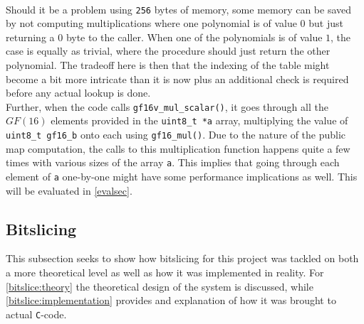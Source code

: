 \medskip\\
Should it be a problem using \texttt{256} bytes of memory, some memory can be saved by not computing multiplications where one polynomial is of value $0$ but just returning a $0$ byte to the caller. When one of the polynomials is of value $1$, the case is equally as trivial, where the procedure should just return the other polynomial. The tradeoff here is then that the indexing of the table might become a bit more intricate than it is now plus an additional check is required before any actual lookup is done.
\medskip\\
Further, when the code calls \texttt{gf16v\_mul\_scalar()}, it goes through all the $GF(16)$ elements provided in the \texttt{uint8\_t *a} array, multiplying the value of \texttt{uint8\_t gf16\_b} onto each using \texttt{gf16\_mul()}. Due to the nature of the public map computation, the calls to this multiplication function happens quite a few times with various sizes of the array \texttt{a}. This implies that going through each element of \texttt{a} one-by-one might have some performance implications as well. This will be evaluated in \cref{evalsec}.
\subsection{Bitslicing} \label{opt:bitslice}
This subsection seeks to show how bitslicing for this project was tackled on both a more theoretical level as well as how it was implemented in reality. For \cref{bitslice:theory} the theoretical design of the system is discussed, while \cref{bitslice:implementation} provides and explanation of how it was brought to actual \texttt{C}-code.
